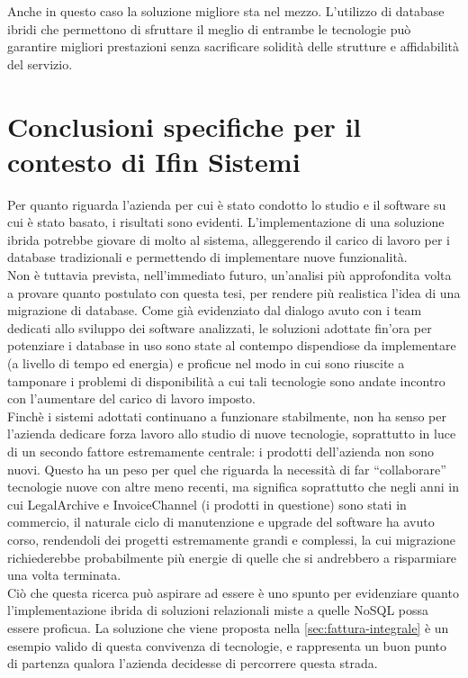 \noindent Anche in questo caso la soluzione migliore sta nel mezzo. L'utilizzo di database ibridi che permettono di sfruttare il meglio di entrambe le tecnologie può garantire migliori prestazioni senza sacrificare solidità delle strutture e affidabilità del servizio.\\


\section{Conclusioni specifiche per il contesto di Ifin Sistemi}
Per quanto riguarda l'azienda per cui è stato condotto lo studio e il software su cui è stato basato, i risultati sono evidenti. L'implementazione di una soluzione ibrida potrebbe giovare di molto al sistema, alleggerendo il carico di lavoro per i database tradizionali e permettendo di implementare nuove funzionalità.\\

\noindent Non è tuttavia prevista, nell'immediato futuro, un'analisi più approfondita volta a provare quanto postulato con questa tesi, per rendere più realistica l'idea di una migrazione di database. Come già evidenziato dal dialogo avuto con i team dedicati allo sviluppo dei software analizzati, le soluzioni adottate fin'ora per potenziare i database in uso sono state al contempo dispendiose da implementare (a livello di tempo ed energia) e proficue nel modo in cui sono riuscite a tamponare i problemi di disponibilità a cui tali tecnologie sono andate incontro con l'aumentare del carico di lavoro imposto.\\
Finchè i sistemi adottati continuano a funzionare stabilmente, non ha senso per l'azienda dedicare forza lavoro allo studio di nuove tecnologie, soprattutto in luce di un secondo fattore estremamente centrale: i prodotti dell'azienda non sono nuovi. Questo ha un peso per quel che riguarda la necessità di far ``collaborare'' tecnologie nuove con altre meno recenti, ma significa soprattutto che negli anni in cui LegalArchive e InvoiceChannel (i prodotti in questione) sono stati in commercio, il naturale ciclo di manutenzione e upgrade del software ha avuto corso, rendendoli dei progetti estremamente grandi e complessi, la cui migrazione richiederebbe probabilmente più energie di quelle che si andrebbero a risparmiare una volta terminata.\\

\noindent Ciò che questa ricerca può aspirare ad essere è uno spunto per evidenziare quanto l'implementazione ibrida di soluzioni relazionali miste a quelle NoSQL possa essere proficua. La soluzione che viene proposta nella \autoref{sec:fattura-integrale} è un esempio valido di questa convivenza di tecnologie, e rappresenta un buon punto di partenza qualora l'azienda decidesse di percorrere questa strada.\\


